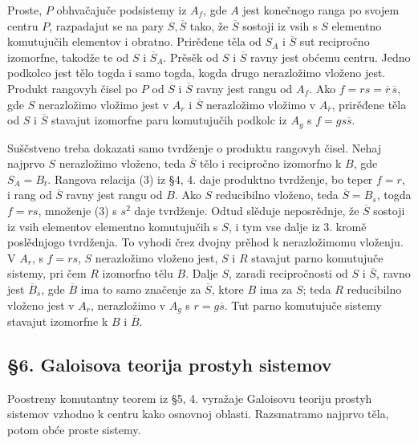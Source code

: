 \documentclass[11pt]{article}
\begin{document}
Proste, \(P\) obhvačajuče podsistemy iz \(A_f\), gde \(A\) jest konečnogo ranga po svojem centru \(P\), razpadajut se na pary \(S,\overline S\) tako, že \(\overline S\) sostoji iz vsih s \(S\) elementno komutujučih elementov i obratno. Prirěđene těla od \(S_A\) i \(\overline S\) sut recipročno izomorfne, takodže te od \(S\) i \(\overline S_A\). Prěsěk od \(S\) i \(\overline S\) ravny jest obćemu centru. Jedno podkolco jest tělo togda i samo togda, kogda drugo nerazložimo vloženo jest. Produkt rangovyh čisel po \(P\) od \(S\) i \(\overline S\) ravny jest rangu od \(A_f\). Ako \(f=rs=\overline r\,\overline s\), gde \(S\) nerazložimo vložimo jest v \(A_r\) i \(\overline S\) nerazložimo vložimo v \(A_{\overline r}\), prirěđene těla od \(S\) i \(\overline S\) stavajut izomorfne paru komutujučih podkolc iz \(A_g\) s \(f=g s\overline s\).

Suščstveno treba dokazati samo tvrdženje o produktu rangovyh čisel. Nehaj najprvo \(S\) nerazložimo vloženo, teda \(\overline S\) tělo i recipročno izomorfno k \(B\), gde \(S_A=B_t\). Rangova relacija (3) iz §4, 4. daje produktno tvrdženje, bo teper \(f=r\), i rang od \(\overline S\) ravny jest rangu od \(B\). Ako \(S\) reducibilno vloženo, teda \(\overline S=B_s\), togda \(f=rs\), množenje (3) s \(s^2\) daje tvrdženje. Odtud slěduje neposrědnje, že \(\overline S\) sostoji iz vsih elementov elementno komutujučih s \(S\), i tym vse dalje iz 3. kromě poslědnjogo tvrdženja. To vyhodi črez dvojny prěhod k nerazložimomu vloženju. V \(A_r\), s \(f=rs\), \(S\) nerazložimo vloženo jest, \(S\) i \(R\) stavajut parno komutujuče sistemy, pri čem \(R\) izomorfno tělu \(B\). Dalje \(S\), zaradi recipročnosti od \(S\) i \(\overline S\), ravno jest \(\overline B_s\), gde \(\overline B\) ima to samo značenje za \(\overline S\), ktore \(B\) ima za \(S\); teda \(R\) reducibilno vloženo jest v \(A_r\), nerazložimo v \(A_g\) s \(r=g\overline s\). Tut parno komutujuče sistemy stavajut izomorfne k \(B\) i \(\overline B\).

\subsection*{§6. Galoisova teorija prostyh sistemov}

Poostreny komutantny teorem iz §5, 4. vyražaje Galoisovu teoriju prostyh sistemov vzhodno k centru kako osnovnoj oblasti. Razsmatramo najprvo těla, potom obće proste sistemy.
\end{document}
